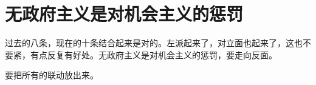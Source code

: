 \section[无政府主义是对机会主义的惩罚（一九六七年四月）]{无政府主义是对机会主义的惩罚}


过去的八条，现在的十条结合起来是对的。左派起来了，对立面也起来了，这也不要紧，有点反复有好处。无政府主义是对机会主义的惩罚，要走向反面。

要把所有的联动放出来。


